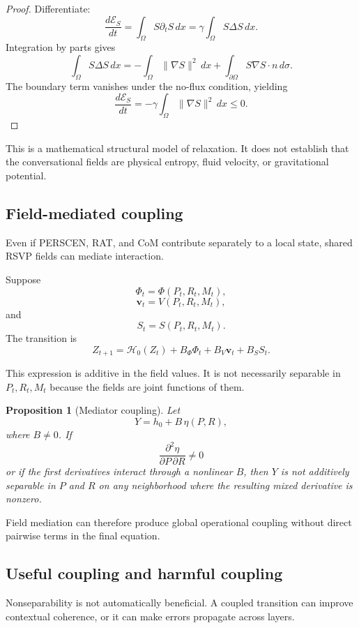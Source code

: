 \documentclass[11pt]{article}
\newtheorem{proposition}[definition]{Proposition}
\theoremstyle{definition}
\newcommand{\Hh}{\mathcal{H}}
\newcommand{\FieldPhi}{\Phi}
\newcommand{\FieldV}{\mathbf{v}}
\newcommand{\FieldS}{S}
\begin{document}
\begin{proof}
Differentiate:
\[
\frac{d\mathscr E_S}{dt}
=
\int_\Omega
\FieldS\partial_t\FieldS
\,dx
=
\gamma
\int_\Omega
\FieldS\Delta\FieldS
\,dx.
\]
Integration by parts gives
\[
\int_\Omega
\FieldS\Delta\FieldS
\,dx
=
-\int_\Omega
\|\nabla\FieldS\|^2
\,dx
+
\int_{\partial\Omega}
\FieldS\nabla\FieldS\cdot n\,d\sigma.
\]
The boundary term vanishes under the no-flux condition, yielding
\[
\frac{d\mathscr E_S}{dt}
=
-\gamma
\int_\Omega
\|\nabla\FieldS\|^2
\,dx
\leq0.
\]
\end{proof}

This is a mathematical structural model of relaxation. It does not establish that the conversational fields are physical entropy, fluid velocity, or gravitational potential.

\subsection{Field-mediated coupling}

Even if PERSCEN, RAT, and CoM contribute separately to a local state, shared RSVP fields can mediate interaction.

Suppose
\[
\FieldPhi_t
=
\Phi(P_t,R_t,M_t),
\]
\[
\FieldV_t
=
V(P_t,R_t,M_t),
\]
and
\[
\FieldS_t
=
S(P_t,R_t,M_t).
\]
The transition is
\[
Z_{t+1}
=
\Hh_0(Z_t)
+
B_\Phi\FieldPhi_t
+
B_V\FieldV_t
+
B_S\FieldS_t.
\]

This expression is additive in the field values. It is not necessarily separable in \(P_t,R_t,M_t\) because the fields are joint functions of them.

\begin{proposition}[Mediator coupling]
Let
\[
Y
=
h_0+
B\,\eta(P,R),
\]
where \(B\neq0\). If
\[
\frac{\partial^2\eta}{\partial P\,\partial R}\neq0
\]
or if the first derivatives interact through a nonlinear \(B\), then \(Y\) is not additively separable in \(P\) and \(R\) on any neighborhood where the resulting mixed derivative is nonzero.
\end{proposition}

Field mediation can therefore produce global operational coupling without direct pairwise terms in the final equation.

\subsection{Useful coupling and harmful coupling}

Nonseparability is not automatically beneficial. A coupled transition can improve contextual coherence, or it can make errors propagate across layers.
\end{document}
